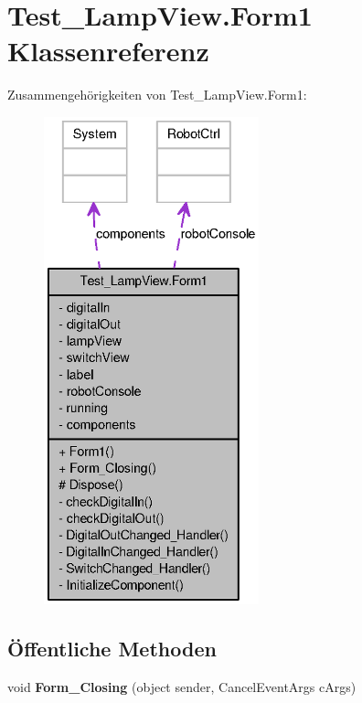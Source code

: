 \hypertarget{class_test___lamp_view_1_1_form1}{
\section{Test\_\-LampView.Form1 Klassenreferenz}
\label{class_test___lamp_view_1_1_form1}
}


Zusammengehörigkeiten von Test\_\-LampView.Form1:\nopagebreak
\begin{figure}[H]
\begin{center}
\leavevmode
\includegraphics[height=400pt]{class_test___lamp_view_1_1_form1__coll__graph}
\end{center}
\end{figure}
\subsection*{Öffentliche Methoden}
\begin{DoxyCompactItemize}
\item 
\hypertarget{class_test___lamp_view_1_1_form1_ab636f3452c098856ab41a106f7d496d1}{
void {\bfseries Form\_\-Closing} (object sender, CancelEventArgs cArgs)}
\label{class_test___lamp_view_1_1_form1_ab636f3452c098856ab41a106f7d496d1}

\end{DoxyCompactItemize}
